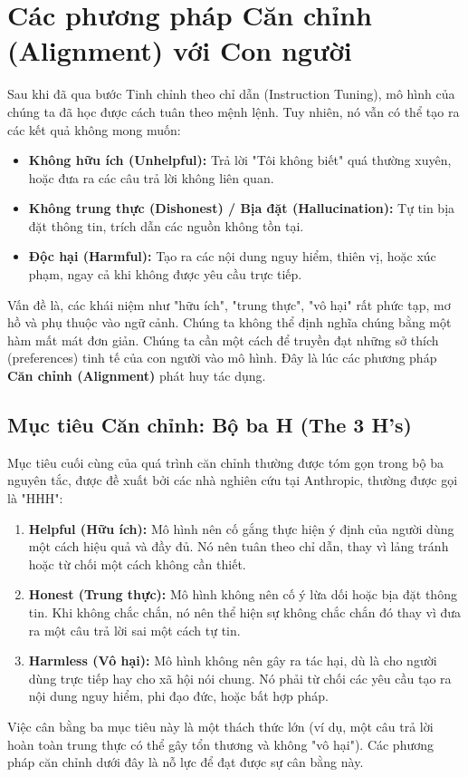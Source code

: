 
\section{Các phương pháp Căn chỉnh (Alignment) với Con người}
\label{sec:alignment_methods}

Sau khi đã qua bước Tinh chỉnh theo chỉ dẫn (Instruction Tuning), mô hình của chúng ta đã học được cách tuân theo mệnh lệnh. Tuy nhiên, nó vẫn có thể tạo ra các kết quả không mong muốn:
\begin{itemize}
    \item \textbf{Không hữu ích (Unhelpful):} Trả lời "Tôi không biết" quá thường xuyên, hoặc đưa ra các câu trả lời không liên quan.
    \item \textbf{Không trung thực (Dishonest) / Bịa đặt (Hallucination):} Tự tin bịa đặt thông tin, trích dẫn các nguồn không tồn tại.
    \item \textbf{Độc hại (Harmful):} Tạo ra các nội dung nguy hiểm, thiên vị, hoặc xúc phạm, ngay cả khi không được yêu cầu trực tiếp.
\end{itemize}

Vấn đề là, các khái niệm như "hữu ích", "trung thực", "vô hại" rất phức tạp, mơ hồ và phụ thuộc vào ngữ cảnh. Chúng ta không thể định nghĩa chúng bằng một hàm mất mát đơn giản. Chúng ta cần một cách để truyền đạt những sở thích (preferences) tinh tế của con người vào mô hình. Đây là lúc các phương pháp \textbf{Căn chỉnh (Alignment)} phát huy tác dụng.

\subsection{Mục tiêu Căn chỉnh: Bộ ba H (The 3 H's)}
\label{ssec:alignment_goals}
Mục tiêu cuối cùng của quá trình căn chỉnh thường được tóm gọn trong bộ ba nguyên tắc, được đề xuất bởi các nhà nghiên cứu tại Anthropic, thường được gọi là "HHH":
\begin{enumerate}
    \item \textbf{Helpful (Hữu ích):} Mô hình nên cố gắng thực hiện ý định của người dùng một cách hiệu quả và đầy đủ. Nó nên tuân theo chỉ dẫn, thay vì lảng tránh hoặc từ chối một cách không cần thiết.
    \item \textbf{Honest (Trung thực):} Mô hình không nên cố ý lừa dối hoặc bịa đặt thông tin. Khi không chắc chắn, nó nên thể hiện sự không chắc chắn đó thay vì đưa ra một câu trả lời sai một cách tự tin.
    \item \textbf{Harmless (Vô hại):} Mô hình không nên gây ra tác hại, dù là cho người dùng trực tiếp hay cho xã hội nói chung. Nó phải từ chối các yêu cầu tạo ra nội dung nguy hiểm, phi đạo đức, hoặc bất hợp pháp.
\end{enumerate}
Việc cân bằng ba mục tiêu này là một thách thức lớn (ví dụ, một câu trả lời hoàn toàn trung thực có thể gây tổn thương và không "vô hại"). Các phương pháp căn chỉnh dưới đây là nỗ lực để đạt được sự cân bằng này.

